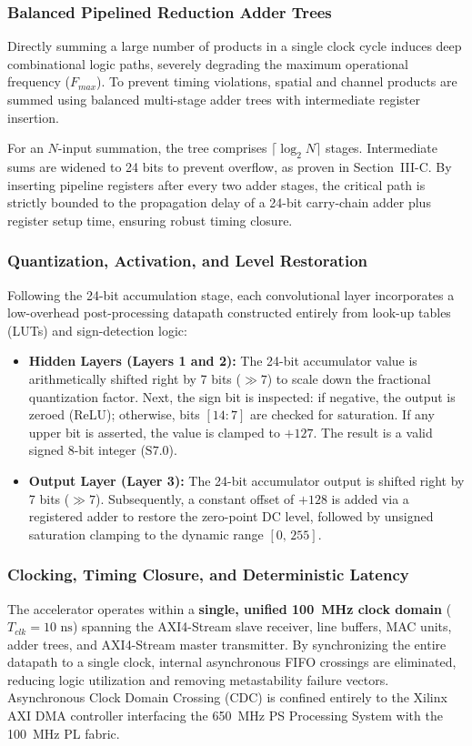 \documentclass[conference]{IEEEtran}
\begin{document}
\subsubsection{Balanced Pipelined Reduction Adder Trees}
Directly summing a large number of products in a single clock cycle induces deep combinational logic paths, severely degrading the maximum operational frequency ($F_{max}$). To prevent timing violations, spatial and channel products are summed using balanced multi-stage adder trees with intermediate register insertion.

For an $N$-input summation, the tree comprises $\lceil \log_2 N \rceil$ stages. Intermediate sums are widened to 24 bits to prevent overflow, as proven in Section~III-C. By inserting pipeline registers after every two adder stages, the critical path is strictly bounded to the propagation delay of a 24-bit carry-chain adder plus register setup time, ensuring robust timing closure.

\subsubsection{Quantization, Activation, and Level Restoration}
Following the 24-bit accumulation stage, each convolutional layer incorporates a low-overhead post-processing datapath constructed entirely from look-up tables (LUTs) and sign-detection logic:
\begin{itemize}
    \item \textbf{Hidden Layers (Layers 1 and 2):} The 24-bit accumulator value is arithmetically shifted right by 7 bits ($\gg 7$) to scale down the fractional quantization factor. Next, the sign bit is inspected: if negative, the output is zeroed (ReLU); otherwise, bits $[14:7]$ are checked for saturation. If any upper bit is asserted, the value is clamped to $+127$. The result is a valid signed 8-bit integer ($\text{S7.0}$).
    \item \textbf{Output Layer (Layer 3):} The 24-bit accumulator output is shifted right by 7 bits ($\gg 7$). Subsequently, a constant offset of $+128$ is added via a registered adder to restore the zero-point DC level, followed by unsigned saturation clamping to the dynamic range $[0,\, 255]$.
\end{itemize}

\subsubsection{Clocking, Timing Closure, and Deterministic Latency}
The accelerator operates within a \textbf{single, unified 100~MHz clock domain} ($T_{clk} = 10\text{ ns}$) spanning the AXI4-Stream slave receiver, line buffers, MAC units, adder trees, and AXI4-Stream master transmitter. By synchronizing the entire datapath to a single clock, internal asynchronous FIFO crossings are eliminated, reducing logic utilization and removing metastability failure vectors. Asynchronous Clock Domain Crossing (CDC) is confined entirely to the Xilinx AXI DMA controller interfacing the 650~MHz PS Processing System with the 100~MHz PL fabric.
\end{document}
